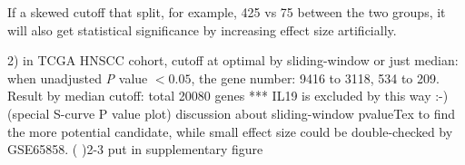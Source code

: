 \documentclass[preprint,12pt]{elsarticle}
\newenvironment{MyColorPar}[1]{%
    \leavevmode\color{#1}\ignorespaces%
}{%
}%
\begin{document}
\begin{MyColorPar}{blue}
\begin{MyColorPar}{red}
If a skewed cutoff that split, for example, 425 vs 75 between the two groups, it will also get statistical significance by increasing effect size artificially.






 





2) in TCGA HNSCC cohort, 
cutoff at optimal by sliding-window or just median:
when unadjusted \textit{P} value $<0.05$, the gene number: 9416 to 3118, 534 to 209.
Result by median cutoff: total 20080 genes 
*** IL19 is excluded by this way :-) (special S-curve P value plot)
discussion about sliding-window pvalueTex to find the more potential candidate, while small effect size could be double-checked by GSE65858.
(  )2-3 put in supplementary figure %



\end{MyColorPar}
\end{MyColorPar}
\end{document}
